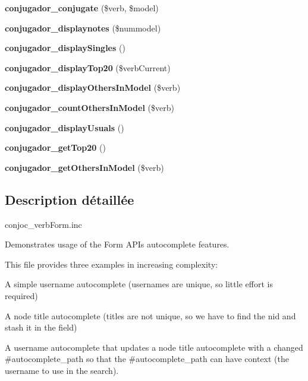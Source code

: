 \begin{DoxyCompactItemize}
{\bfseries conjugador\+\_\+conjugate} (\$verb, \$model)
\item 
\hypertarget{php_2conjoc__webForm_8inc_a16562f736e2ff741407adb1ceb3c9170}{}\label{php_2conjoc__webForm_8inc_a16562f736e2ff741407adb1ceb3c9170} 
{\bfseries conjugador\+\_\+displaynotes} (\$nummodel)
\item 
\hypertarget{php_2conjoc__webForm_8inc_ac41ee7cf6ccd6dd46de8112c7c315cfe}{}\label{php_2conjoc__webForm_8inc_ac41ee7cf6ccd6dd46de8112c7c315cfe} 
{\bfseries conjugador\+\_\+display\+Singles} ()
\item 
\hypertarget{php_2conjoc__webForm_8inc_adfb69460570fdffecec436447f5ed729}{}\label{php_2conjoc__webForm_8inc_adfb69460570fdffecec436447f5ed729} 
{\bfseries conjugador\+\_\+display\+Top20} (\$verb\+Current)
\item 
\hypertarget{php_2conjoc__webForm_8inc_a64885b968e081840d6a10adc2a38db9e}{}\label{php_2conjoc__webForm_8inc_a64885b968e081840d6a10adc2a38db9e} 
{\bfseries conjugador\+\_\+display\+Others\+In\+Model} (\$verb)
\item 
\hypertarget{php_2conjoc__webForm_8inc_ac96a30f96cb3957ed4ac47c4eb40df10}{}\label{php_2conjoc__webForm_8inc_ac96a30f96cb3957ed4ac47c4eb40df10} 
{\bfseries conjugador\+\_\+count\+Others\+In\+Model} (\$verb)
\item 
\hypertarget{php_2conjoc__webForm_8inc_a1bfbce593ac5c763b1542fa713249aa3}{}\label{php_2conjoc__webForm_8inc_a1bfbce593ac5c763b1542fa713249aa3} 
{\bfseries conjugador\+\_\+display\+Usuals} ()
\item 
\hypertarget{php_2conjoc__webForm_8inc_a9ab9dfc2c3015a0855c27f37812bb897}{}\label{php_2conjoc__webForm_8inc_a9ab9dfc2c3015a0855c27f37812bb897} 
{\bfseries conjugador\+\_\+get\+Top20} ()
\item 
\hypertarget{php_2conjoc__webForm_8inc_a90ac7751a59eefed3b3576f1cedb016f}{}\label{php_2conjoc__webForm_8inc_a90ac7751a59eefed3b3576f1cedb016f} 
{\bfseries conjugador\+\_\+get\+Others\+In\+Model} (\$verb)
\end{DoxyCompactItemize}


\subsection{Description détaillée}
conjoc\+\_\+verb\+Form.\+inc

Demonstrates usage of the Form A\+PI\textquotesingle{}s autocomplete features.

This file provides three examples in increasing complexity\+:
\begin{DoxyItemize}
\item A simple username autocomplete (usernames are unique, so little effort is required)
\item A node title autocomplete (titles are not unique, so we have to find the nid and stash it in the field)
\item A username autocomplete that updates a node title autocomplete with a changed \#autocomplete\+\_\+path so that the \#autocomplete\+\_\+path can have context (the username to use in the search). 
\end{DoxyItemize}


